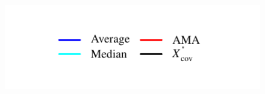 \documentclass[11pt]{article}
\theoremstyle{definition}
\theoremstyle{definition}
\begin{document}
\begin{figure}[t!]
\captionsetup{width=0.48\textwidth}
\vspace{-2em}
        \centering
        \begin{minipage}[b]{0.495\textwidth}
	\hspace*{1em} 	\includegraphics[width=\textwidth]{legendPoints.pdf} %
	\vspace{-4.5em}


\end{minipage}
\end{figure}
\end{document}
